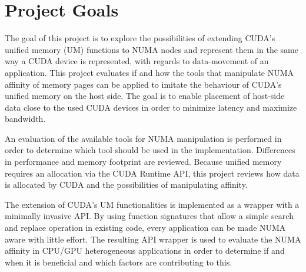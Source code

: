 \chapter{Project Goals}\label{c:target}
The goal of this project is to explore the possibilities of extending CUDA's unified memory (UM) functions to 
NUMA nodes and represent them in the same way a CUDA device is represented, with regards to data-movement
of an application. This project evaluates if and how the tools that manipulate NUMA affinity of memory pages can be applied to imitate the behaviour of CUDA's unified memory on the host side. The goal is to enable placement of
host-side data close to the used CUDA devices in order to minimize latency and maximize bandwidth.

An evaluation of the available tools for NUMA manipulation is performed in order to determine which tool
should be used in the implementation. Differences in performance and memory footprint are reviewed.
Because unified memory requires an allocation via the CUDA Runtime API, this project reviews how data
is allocated by CUDA and the possibilities of manipulating affinity.

The extension of CUDA's UM functionalities is implemented as a wrapper with a minimally invasive API. By using
function signatures that allow a simple search and replace operation in existing code, every application
can be made NUMA aware with little effort.
The resulting API wrapper is used to evaluate the NUMA affinity in CPU/GPU heterogeneous applications in
order to determine if and when it is beneficial and which factors are contributing to this.
%
